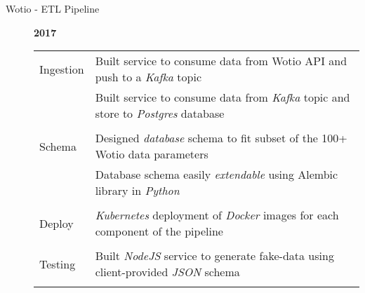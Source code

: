\documentclass[12pt]{article}
\begin{document}
\begin{description}
\begin{description}
                \item[Wotio - ETL Pipeline] \hfill \textbf{2017}\\
                    \begin{tabular}{l|l}
				\\[-1.0mm]
                        Ingestion    & Built service to consume data from Wotio API and push to a \textit{Kafka} topic\\
                                  & Built service to consume data from \textit{Kafka} topic and store to \textit{Postgres} database\\
				\\[-1.7mm]
                        Schema   & Designed \textit{database} schema to fit subset of the 100+ Wotio data parameters\\
				  & Database schema easily \textit{extendable} using Alembic library in \textit{Python}\\
				\\[-1.7mm]
                        Deploy& \textit{Kubernetes} deployment of \textit{Docker} images for each component of the pipeline\\
				\\[-1.7mm]
                        Testing      & Built \textit{NodeJS} service to generate fake-data using client-provided \textit{JSON} schema\\
			        \\[-1.0mm]
                    \end{tabular}


\end{description}
\end{description}
\end{document}
